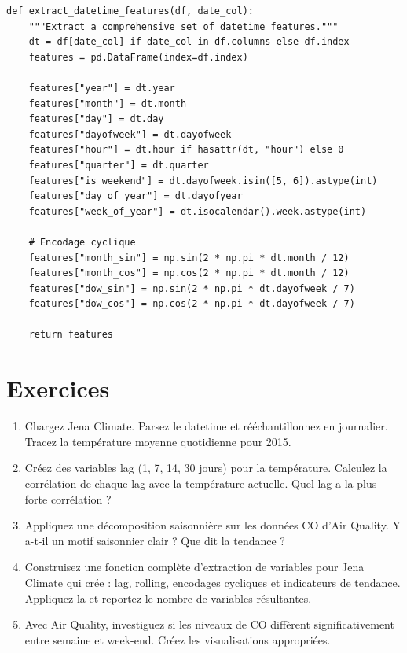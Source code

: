 \begin{verbatim}
def extract_datetime_features(df, date_col):
    """Extract a comprehensive set of datetime features."""
    dt = df[date_col] if date_col in df.columns else df.index
    features = pd.DataFrame(index=df.index)

    features["year"] = dt.year
    features["month"] = dt.month
    features["day"] = dt.day
    features["dayofweek"] = dt.dayofweek
    features["hour"] = dt.hour if hasattr(dt, "hour") else 0
    features["quarter"] = dt.quarter
    features["is_weekend"] = dt.dayofweek.isin([5, 6]).astype(int)
    features["day_of_year"] = dt.dayofyear
    features["week_of_year"] = dt.isocalendar().week.astype(int)

    # Encodage cyclique
    features["month_sin"] = np.sin(2 * np.pi * dt.month / 12)
    features["month_cos"] = np.cos(2 * np.pi * dt.month / 12)
    features["dow_sin"] = np.sin(2 * np.pi * dt.dayofweek / 7)
    features["dow_cos"] = np.cos(2 * np.pi * dt.dayofweek / 7)

    return features
\end{verbatim}

\section{Exercices}

\begin{exercise}
\begin{enumerate}
  \item Chargez Jena Climate. Parsez le datetime et r\'e\'echantillonnez en journalier. Tracez la temp\'erature moyenne quotidienne pour 2015.
  \item Cr\'eez des variables lag (1, 7, 14, 30 jours) pour la temp\'erature. Calculez la corr\'elation de chaque lag avec la temp\'erature actuelle. Quel lag a la plus forte corr\'elation ?
  \item Appliquez une d\'ecomposition saisonni\`ere sur les donn\'ees CO d'Air Quality. Y a-t-il un motif saisonnier clair ? Que dit la tendance ?
  \item Construisez une fonction compl\`ete d'extraction de variables pour Jena Climate qui cr\'ee : lag, rolling, encodages cycliques et indicateurs de tendance. Appliquez-la et reportez le nombre de variables r\'esultantes.
  \item Avec Air Quality, investiguez si les niveaux de CO diff\`erent significativement entre semaine et week-end. Cr\'eez les visualisations appropri\'ees.
\end{enumerate}
\end{exercise}


